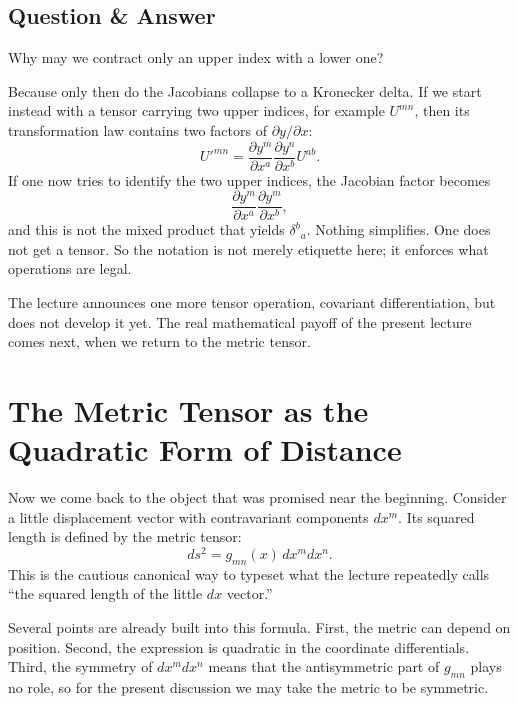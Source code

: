 \subsection{Question \& Answer}

Why may we contract only an upper index with a lower one?

Because only then do the Jacobians collapse to a Kronecker delta. If we start instead with a tensor carrying two upper indices, for example \(U^{mn}\), then its transformation law contains two factors of \(\partial y/\partial x\):
\begin{equation}
U'^{mn}
=
\frac{\partial y^m}{\partial x^a}
\frac{\partial y^n}{\partial x^b}
U^{ab}.
\end{equation}
If one now tries to identify the two upper indices, the Jacobian factor becomes
\begin{equation}
\frac{\partial y^m}{\partial x^a}
\frac{\partial y^m}{\partial x^b},
\end{equation}
and this is not the mixed product that yields \(\delta^b{}_a\). Nothing simplifies. One does not get a tensor. So the notation is not merely etiquette here; it enforces what operations are legal.

The lecture announces one more tensor operation, covariant differentiation, but does not develop it yet. The real mathematical payoff of the present lecture comes next, when we return to the metric tensor.

\section{The Metric Tensor as the Quadratic Form of Distance}

Now we come back to the object that was promised near the beginning. Consider a little displacement vector with contravariant components \(dx^m\). Its squared length is defined by the metric tensor:
\begin{equation}
ds^2 = g_{mn}(x)\,dx^m dx^n.
\end{equation}
This is the cautious canonical way to typeset what the lecture repeatedly calls ``the squared length of the little \(dx\) vector.''

Several points are already built into this formula. First, the metric can depend on position. Second, the expression is quadratic in the coordinate differentials. Third, the symmetry of \(dx^m dx^n\) means that the antisymmetric part of \(g_{mn}\) plays no role, so for the present discussion we may take the metric to be symmetric.


